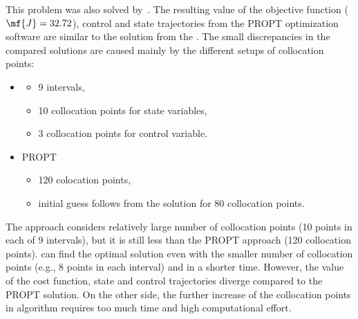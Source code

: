 This problem was also solved by~\citep{rut10}. The resulting value of the objective function ($\mf{J}=32.72$), control and state trajectories from the PROPT optimization software are similar to the solution from the . The small discrepancies in the compared solutions are caused mainly by the different setups of collocation points:
\begin{itemize}
	\item {} 
	\begin{itemize}
		\item 9 intervals,
		\item 10 collocation points for state variables,
		\item 3 collocation points for control variable.
	\end{itemize}
	\item PROPT
	\begin{itemize}
		\item 120 colocation points,
		\item initial guess follows from the solution for 80 collocation points.
	\end{itemize}
\end{itemize}
The  approach considers relatively large number of collocation points (10 points in each of 9 intervals), but it is still less than the PROPT approach (120 collocation points).  can find the optimal solution even with the smaller number of collocation points (e.g., 8 points in each interval) and in a shorter time. However, the value of the cost function, state and control trajectories diverge compared to the PROPT solution. On the other side, the further increase of the collocation points in  algorithm requires too much time and high computational effort.
